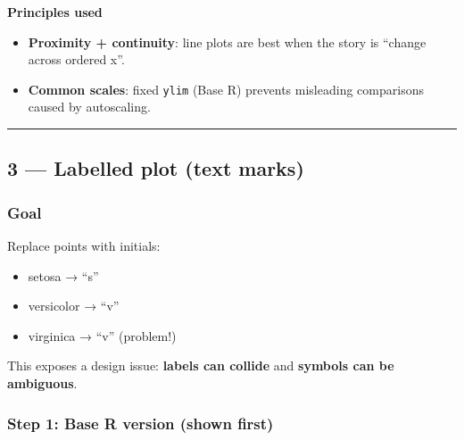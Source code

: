 \documentclass[
  letterpaper,
  DIV=11,
  numbers=noendperiod]{scrartcl}
\providecommand{\tightlist}{%
  \setlength{\itemsep}{0pt}\setlength{\parskip}{0pt}}\usepackage{longtable,booktabs,array}
\begin{document}
\begin{tcolorbox}[enhanced jigsaw, opacitybacktitle=0.6, left=2mm, bottomrule=.15mm, coltitle=black, opacityback=0, toptitle=1mm, title=\textcolor{quarto-callout-note-color}{\faInfo}\hspace{0.5em}{Note}, colbacktitle=quarto-callout-note-color!10!white, breakable, colback=white, rightrule=.15mm, colframe=quarto-callout-note-color-frame, bottomtitle=1mm, arc=.35mm, titlerule=0mm, toprule=.15mm, leftrule=.75mm]

\textbf{Principles used}

\begin{itemize}
\tightlist
\item
  \textbf{Proximity + continuity}: line plots are best when the story is
  ``change across ordered x''.
\item
  \textbf{Common scales}: fixed \texttt{ylim} (Base R) prevents
  misleading comparisons caused by autoscaling.
\end{itemize}

\end{tcolorbox}

\begin{center}\rule{0.5\linewidth}{0.5pt}\end{center}

\subsection{3 --- Labelled plot (text
marks)}\label{labelled-plot-text-marks}

\subsubsection{Goal}\label{goal-2}

Replace points with initials:

\begin{itemize}
\tightlist
\item
  setosa → ``s''
\item
  versicolor → ``v''
\item
  virginica → ``v'' (problem!)
\end{itemize}

This exposes a design issue: \textbf{labels can collide} and
\textbf{symbols can be ambiguous}.

\subsubsection{Step 1: Base R version (shown
first)}\label{step-1-base-r-version-shown-first-2}
\end{document}
